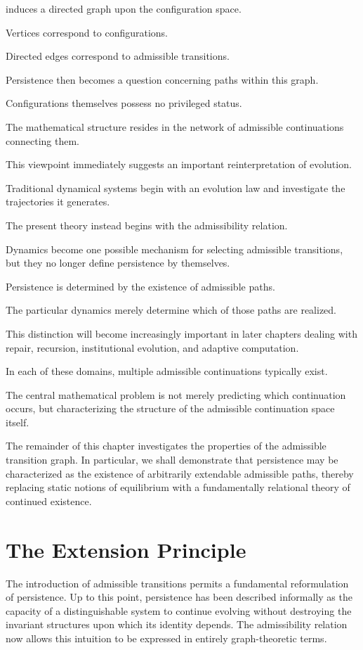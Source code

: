 \documentclass[11pt]{book}
\numberwithin{equation}{chapter}
\theoremstyle{definition}
\theoremstyle{plain}
\begin{document}
induces a directed graph upon the configuration space.

Vertices correspond to configurations.

Directed edges correspond to admissible transitions.

Persistence then becomes a question concerning paths within this graph.

Configurations themselves possess no privileged status.

The mathematical structure resides in the network of admissible continuations connecting them.

This viewpoint immediately suggests an important reinterpretation of evolution.

Traditional dynamical systems begin with an evolution law and investigate the trajectories it generates.

The present theory instead begins with the admissibility relation.

Dynamics become one possible mechanism for selecting admissible transitions, but they no longer define persistence by themselves.

Persistence is determined by the existence of admissible paths.

The particular dynamics merely determine which of those paths are realized.

This distinction will become increasingly important in later chapters dealing with repair, recursion, institutional evolution, and adaptive computation.

In each of these domains, multiple admissible continuations typically exist.

The central mathematical problem is not merely predicting which continuation occurs, but characterizing the structure of the admissible continuation space itself.

The remainder of this chapter investigates the properties of the admissible transition graph. In particular, we shall demonstrate that persistence may be characterized as the existence of arbitrarily extendable admissible paths, thereby replacing static notions of equilibrium with a fundamentally relational theory of continued existence.

\section{The Extension Principle}

The introduction of admissible transitions permits a fundamental reformulation of persistence. Up to this point, persistence has been described informally as the capacity of a distinguishable system to continue evolving without destroying the invariant structures upon which its identity depends. The admissibility relation now allows this intuition to be expressed in entirely graph-theoretic terms.
\end{document}
